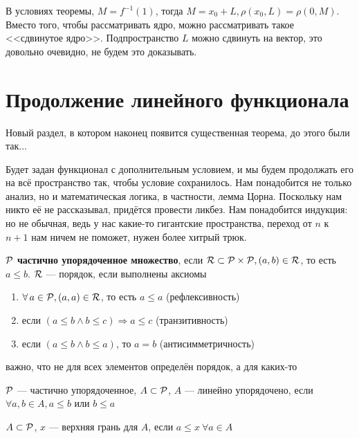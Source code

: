 \documentclass[document]{subfiles}
\begin{document}
\begin{remark}
    В условиях теоремы, $M = f^{-1}(1)$, тогда $M = x_0 + L, \rho(x_0, L) = \rho(0, M)$. Вместо того, чтобы рассматривать ядро, можно рассматривать такое <<сдвинутое ядро>>.
    Подпространство $L$ можно сдвинуть на  вектор, это довольно очевидно, не будем это доказывать.
\end{remark}

\section{Продолжение линейного функционала}

Новый раздел, в котором наконец появится существенная теорема, до этого были так...

Будет задан функционал с дополнительным условием, и мы будем продолжать его на всё пространство так, чтобы условие сохранилось. Нам понадобится не только анализ, но и математическая логика, в частности, лемма Цорна. Поскольку 
нам никто её не рассказывал, придётся провести ликбез.
Нам понадобится индукция: но не обычная, ведь у нас какие-то гигантские пространства, переход от $n$ к $n+1$ нам ничем не поможет, нужен более хитрый трюк.

\begin{definition}
    $\mathcal{P}$ \textbf{ частично упорядоченное множество}, если $\mathcal{R} \subset \mathcal{P} \times \mathcal{P}, (a,b) \in \mathcal{R}$, то есть $a \leq b$. $\mathcal{R}$ --- порядок, если выполнены аксиомы 
    \begin{enumerate}
        \item $\forall a \in \Rho, (a,a) \in \R$, то есть $a \leq a$ (рефлексивность)
        \item если $(a \leq b \land b \leq c) \Rightarrow a \leq c$ (транзитивность)
        \item если $(a \leq b \land b \leq a)$, то $a = b$ (антисимметричность)
    \end{enumerate}
    важно, что не для всех элементов определён порядок, а для каких-то
\end{definition}

\begin{definition}
    $\mathcal{P}$ --- частично упорядоченное, $A \subset \mathcal{P}$, $A$ --- линейно упорядочено, если $\forall a,b \in A, a \leq b$ или $b \leq a$
\end{definition}

\begin{definition}
    $A \subset \mathcal{P}$, $x$ --- верхняя грань для $A$, если $a \leq x \: \forall a \in A$
\end{definition}
\end{document}
